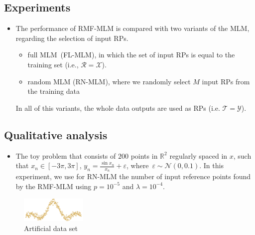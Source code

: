 \documentclass[final]{beamer}
\begin{document}
\begin{frame}[t]
\begin{multicols}{3}
\section{Experiments}

\begin{itemize}
    \item The performance of RMF-MLM is compared with two variants of the MLM, regarding the selection of input RPs.
    \begin{itemize}
        \item full MLM~(FL-MLM), in which the set of input RPs is equal to the training set (i.e., $\mathcal{R} = \mathcal{X}$).
        \item random MLM (RN-MLM), where we randomly select $M$ input RPs from the training data
    \end{itemize}
    In all of this variants, the whole data outputs are used as RPs (i.e. $\mathcal{T} = \mathcal{Y}$).
\end{itemize}

\subsection{Qualitative analysis}
\begin{itemize}
    \item The toy problem that consists of $200$ points in $\mathbb{R}^2$ regularly spaced in $x$, such that $x_n \in [-3\pi,3\pi]$, $y_n = \frac{\sin{x_n}}{x_n} + \varepsilon$, where~$\varepsilon \sim \mathcal{N}(0, 0.1)$. In this experiment, we use for RN-MLM the number of input reference points found by the RMF-MLM using $p=10^{-5}$ and $\lambda = 10^{-4}$. 
\end{itemize}

\begin{figure}
    \centering
    \includegraphics[width=0.28\textwidth]{data.pdf}
    \caption{Artificial data set}
    \label{fig:my_label}
\end{figure}

\newpage 


\begin{figure}
    \centering
    

\end{figure}
\end{multicols}
\end{frame}
\end{document}
